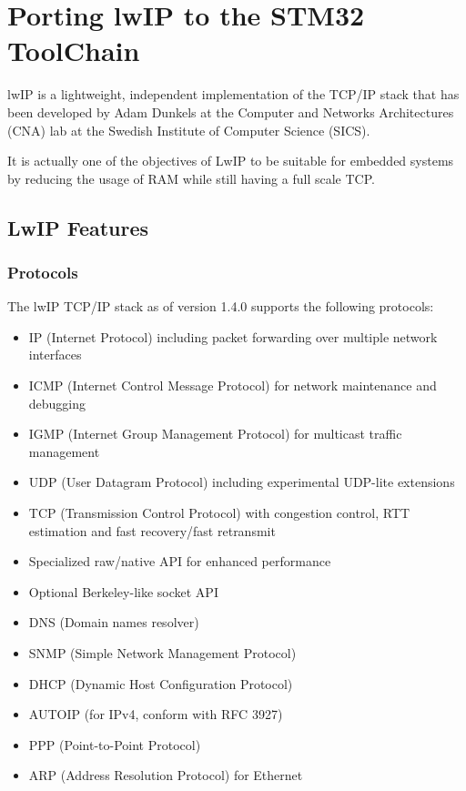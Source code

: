 
\chapter {Porting lwIP to the STM32 ToolChain}

lwIP is a lightweight, independent implementation of the TCP/IP stack that has been developed by Adam Dunkels at the Computer and Networks Architectures (CNA) lab at the Swedish Institute of Computer Science (SICS).

It is actually one of the objectives of LwIP to be suitable for embedded systems by reducing the usage of RAM while still having a full scale TCP.

\section{LwIP Features}

\subsection { Protocols }
The lwIP TCP/IP stack as of version 1.4.0 supports the following protocols:
\begin{itemize}
  \item IP (Internet Protocol) including packet forwarding over multiple network
    interfaces
  \item ICMP (Internet Control Message Protocol) for network maintenance and debugging
  \item IGMP (Internet Group Management Protocol) for multicast traffic management
  \item UDP (User Datagram Protocol) including experimental UDP-lite extensions
  \item TCP (Transmission Control Protocol) with congestion control, RTT estimation
    and fast recovery/fast retransmit
  \item Specialized raw/native API for enhanced performance
  \item Optional Berkeley-like socket API
  \item DNS (Domain names resolver)
  \item SNMP (Simple Network Management Protocol)
  \item DHCP (Dynamic Host Configuration Protocol)
  \item AUTOIP (for IPv4, conform with RFC 3927)
  \item PPP (Point-to-Point Protocol)
  \item ARP (Address Resolution Protocol) for Ethernet
\end{itemize}

